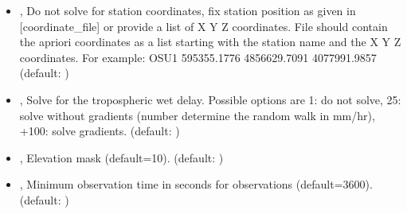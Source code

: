 \documentclass[letterpaper,10pt,english]{sphinxmanual}
\begin{document}
\begin{itemize}
\item {} 
\sphinxAtStartPar
{\hyperref[\detokenize{pgamit.com:LocateRinex.py--fix}]{}} , {\hyperref[\detokenize{pgamit.com:LocateRinex.py---fix_coordinate}]{}}  \sphinxhyphen{} Do not solve for station coordinates, fix station position as given in {[}coordinate\_file{]} or provide a list of X Y Z coordinates. File should contain the apriori coordinates as a list starting with the station name and the X Y Z coordinates. For example: OSU1  595355.1776 \sphinxhyphen{}4856629.7091  4077991.9857 (default: )

\item {} 
\sphinxAtStartPar
{\hyperref[\detokenize{pgamit.com:LocateRinex.py--st}]{}} , {\hyperref[\detokenize{pgamit.com:LocateRinex.py---solve_troposphere}]{}}  \sphinxhyphen{} Solve for the tropospheric wet delay. Possible options are 1: do not solve, 2\sphinxhyphen{}5: solve without gradients (number determine the random walk in mm/hr), +100: solve gradients. (default: )

\item {} 
\sphinxAtStartPar
{\hyperref[\detokenize{pgamit.com:LocateRinex.py--elv}]{}} , {\hyperref[\detokenize{pgamit.com:LocateRinex.py---elevation_mask}]{}}  \sphinxhyphen{} Elevation mask (default=10). (default: )

\item {} 
\sphinxAtStartPar
{\hyperref[\detokenize{pgamit.com:LocateRinex.py--min}]{}} , {\hyperref[\detokenize{pgamit.com:LocateRinex.py---min_time_seconds}]{}}  \sphinxhyphen{} Minimum observation time in seconds for observations (default=3600). (default: )


\end{itemize}
\end{document}
